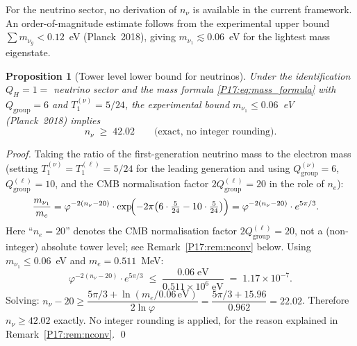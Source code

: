 \documentclass[11pt,a4paper]{article}
\newtheorem{proposition}[theorem]{Proposition}
\theoremstyle{definition}\newtheorem{definition}[theorem]{Definition}
\theoremstyle{remark}
\newcommand{\vp}{\varphi}
\newcommand{\QH}{Q_H}
\begin{document}
For the neutrino sector, no derivation of $n_\nu$ is available in the
current framework. An order-of-magnitude estimate follows from the
experimental upper bound $\sum m_{\nu_g}<0.12$~eV (Planck~2018), giving
$m_{\nu_1}\lesssim0.06$~eV for the lightest mass eigenstate.

\begin{proposition}[Tower level lower bound for neutrinos]
\label{P17:prop:nu_tower_bound}
Under the identification $\QH=1=$ neutrino sector and the mass formula
\eqref{P17:eq:mass_formula} with $Q_{\mathrm{group}}=6$ and $T_1^{(\nu)}=5/24$,
the experimental bound $m_{\nu_1}\leq0.06$~eV (Planck~2018) implies
\begin{equation}
  n_\nu \;\geq\; 42.02 \qquad\text{(exact, no integer rounding)}.
  \label{P17:eq:nu_tower_bound}
\end{equation}
\end{proposition}

\begin{proof}
Taking the ratio of the first-generation neutrino mass to the electron
mass (setting $T_1^{(\nu)}=T_1^{(\ell)}=5/24$ for the leading
generation and using $Q_{\mathrm{group}}^{(\nu)}=6$,
$Q_{\mathrm{group}}^{(\ell)}=10$, and the CMB normalisation factor
$2Q_{\mathrm{group}}^{(\ell)}=20$ in the role of $n_e$):
\begin{align}
  \frac{m_{\nu_1}}{m_e}
  &= \vp^{-2(n_\nu-20)}\cdot
     \exp\!\Bigl(-2\pi\bigl(6\cdot\tfrac{5}{24}-10\cdot\tfrac{5}{24}\bigr)\Bigr)
   = \vp^{-2(n_\nu-20)}\cdot e^{5\pi/3}.
  \label{P17:eq:nu_me_ratio}
\end{align}
Here ``$n_e = 20$'' denotes the CMB normalisation factor
$2Q_{\mathrm{group}}^{(\ell)}=20$, not a (non-integer) absolute tower
level; see Remark~\ref{P17:rem:nconv} below.
Using $m_{\nu_1}\leq0.06$~eV and $m_e=0.511$~MeV:
\[
  \vp^{-2(n_\nu-20)}\cdot e^{5\pi/3}
  \;\leq\;
  \frac{0.06\;\mathrm{eV}}{0.511\times10^6\;\mathrm{eV}}
  \;=\; 1.17\times10^{-7}.
\]
Solving: $n_\nu - 20 \geq \dfrac{5\pi/3 + \ln(m_e/0.06\,\mathrm{eV})}{2\ln\vp}
= \dfrac{5\pi/3 + 15.96}{0.962} = 22.02$.
Therefore $n_\nu\geq42.02$ exactly.  No integer rounding is applied,
for the reason explained in Remark~\ref{P17:rem:nconv}.
\qed
\end{proof}
\end{document}
